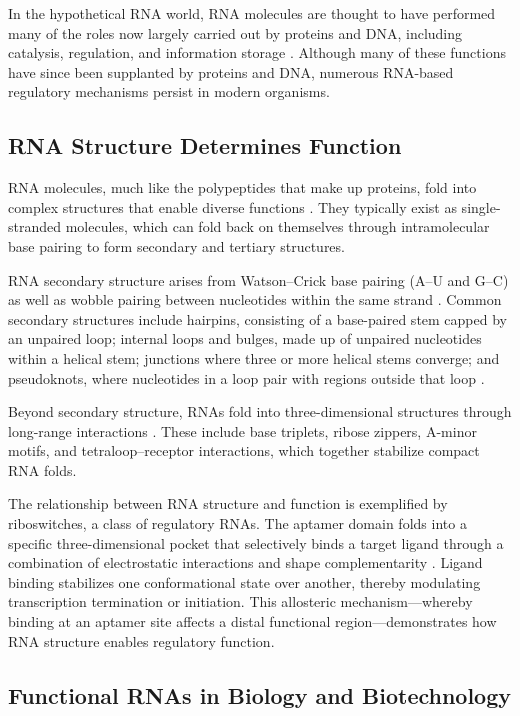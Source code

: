 \documentclass{article}
\begin{document}
In the hypothetical RNA world, RNA molecules are thought to have performed many of the roles now largely carried out by proteins and DNA, including catalysis, regulation, and information storage \parencite{Kruger1982, Guerrier-Takada1983, Gilbert1986, Breaker2012}.
Although many of these functions have since been supplanted by proteins and DNA, numerous RNA-based regulatory mechanisms persist in modern organisms.

\subsection{RNA Structure Determines Function}

RNA molecules, much like the polypeptides that make up proteins, fold into complex structures that enable diverse functions \parencite{Wang2021}.
They typically exist as single-stranded molecules, which can fold back on themselves through intramolecular base pairing to form secondary and tertiary structures.

RNA secondary structure arises from Watson--Crick base pairing (A--U and G--C) as well as wobble pairing between nucleotides within the same strand \parencite{Tinoco1999}. 
Common secondary structures include hairpins, consisting of a base-paired stem capped by an unpaired loop; internal loops and bulges, made up of unpaired nucleotides within a helical stem; junctions where three or more helical stems converge; and pseudoknots, where nucleotides in a loop pair with regions outside that loop \parencite{Staple2005}.

Beyond secondary structure, RNAs fold into three-dimensional structures through long-range interactions \parencite{Batey2004}.
These include base triplets, ribose zippers, A-minor motifs, and tetraloop--receptor interactions, which together stabilize compact RNA folds.

The relationship between RNA structure and function is exemplified by riboswitches, a class of regulatory RNAs.
The aptamer domain folds into a specific three-dimensional pocket that selectively binds a target ligand through a combination of electrostatic interactions and shape complementarity \parencite{Kavita2023}.
Ligand binding stabilizes one conformational state over another, thereby modulating transcription termination or initiation.
This allosteric mechanism—whereby binding at an aptamer site affects a distal functional region—demonstrates how RNA structure enables regulatory function.

\subsection{Functional RNAs in Biology and Biotechnology}
\end{document}
